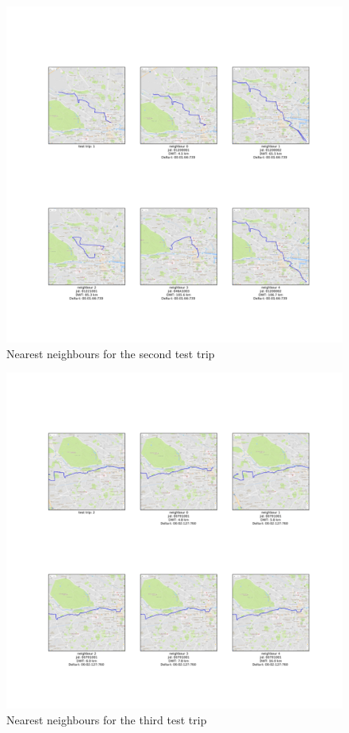 \documentclass[12pt]{article}
\begin{document}
	\begin{figure} [H]
		\begin{center}
			\includegraphics [scale = 0.40] {nn2.jpg}
			\caption{Nearest neighbours for the second test trip}
		\end{center}
	\end{figure}

	\begin{figure} [H]
		\begin{center}
			\includegraphics [scale = 0.40] {nn3.jpg}
			\caption{Nearest neighbours for the third test trip}
		\end{center}
	\end{figure} 
\end{document}
